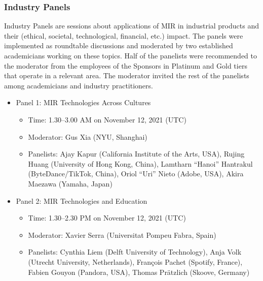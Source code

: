 \documentclass[%
10pt,								%
titlepage,						%
]
{scrartcl}
\begin{document}
        \subsubsection{Industry Panels}
            Industry Panels are sessions about applications of MIR in industrial products and their (ethical, societal, technological, financial, etc.) impact. The panels were implemented as roundtable discussions and moderated by two established academicians working on these topics. Half of the panelists were recommended to the moderator from the employees of the Sponsors in Platinum and Gold tiers that operate in a relevant area. The moderator invited the rest of the panelists among academicians and industry practitioners.
            \begin{itemize}
                \item Panel 1: MIR Technologies Across Cultures
                    \begin{itemize}
                        \item Time: 1.30--3.00 AM on November 12, 2021 (UTC)
                        \item   Moderator: Gus Xia (NYU, Shanghai)
                        \item   Panelists: Ajay Kapur (California Institute of the Arts, USA), Rujing Huang (University of Hong Kong, China), Lamtharn ``Hanoi'' Hantrakul (ByteDance/TikTok, China), Oriol ``Uri'' Nieto (Adobe, USA), Akira Maezawa (Yamaha, Japan)
                    \end{itemize}
                \item Panel 2: MIR Technologies and Education
                    \begin{itemize}
                        \item Time: 1.30--2.30 PM on November 12, 2021 (UTC)
                        \item  Moderator: Xavier Serra (Universitat Pompeu Fabra, Spain)
                        \item  Panelists: Cynthia Liem (Delft University of Technology), Anja Volk (Utrecht University, Netherlands), Fran\c{c}ois Pachet (Spotify, France), Fabien Gouyon (Pandora, USA), Thomas Pr\"atzlich (Skoove, Germany) 
                    \end{itemize}
            \end{itemize}
\end{document}
